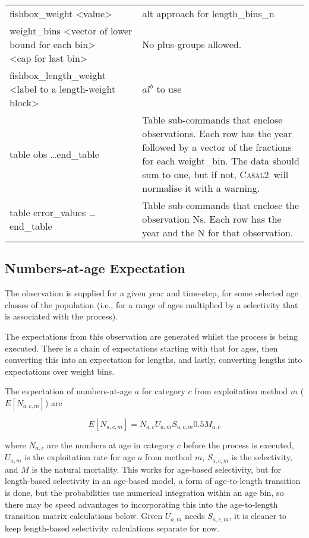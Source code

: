 \documentclass[a4paper,11pt,twoside,pdftex,draft]{article}
\newcommand{\CNAME}{\textsc{Casal2}}
\begin{document}
\begin{table}
\begin{tabular}{ll}
fishbox\_weight <value>& alt approach for length\_bins\_n\\

\parbox[t]{0.5\linewidth}{weight\_bins <vector of lower bound for each bin>
	\textcolor{white}{.}~~~~~~ <cap for last bin>}  & No plus-groups allowed.\\

fishbox\_length\_weight <label to a length-weight block>& $al^{b}$ to use\\


table obs   \dots end\_table &  \parbox[t]{0.3\linewidth}{Table sub-commands that enclose observations.
	Each row has the year followed by a vector of the fractions for each weight\_bin.
	The data should sum to one, but if not, \CNAME~will normalise it with a warning.}\\



table error\_values \dots end\_table   &  \parbox[t]{0.3\linewidth}{Table sub-commands that enclose the observation Ns.
	Each row has the year and the N for that observation.}

\end{tabular}
\end{table}


\subsection{Numbers-at-age Expectation}

The observation is supplied for a given year and time-step, for some selected age classes of the population (i.e., for a range of ages multiplied by a selectivity that is associated with the process).


The expectations from this observation are generated whilst the process is being executed. There is a chain of expectations starting with that for ages, then converting this into an expectation for lengths, and lastly, converting lengths into expectations over weight bins.

The expectation of numbers-at-age $a$ for category $c$ from exploitation method $m$ ($E[N_{a,c,m}]$) are

\begin{equation}
E[N_{a,c,m}] = N_{a,c} U_{a,m} S_{a,c,m} 0.5 M_{a,c}
\end{equation}

where $N_{a,c}$ are the numbers at age in category $c$ before the process is executed, $U_{a,m}$ is the exploitation rate for age $a$ from method $m$, $S_{a,c,m}$ is the selectivity, and $M$ is the natural mortality. This works for age-based selectivity, but for length-based selectivity in an age-based model, a form of age-to-length transition is done, but the probabilities use numerical integration within an age bin, so there may be speed advantages to incorporating this into the age-to-length transition matrix calculations below. Given $U_{a,m}$ needs $S_{a,c,m} $, it is cleaner to keep length-based selectivity calculations separate for now.
\end{document}
